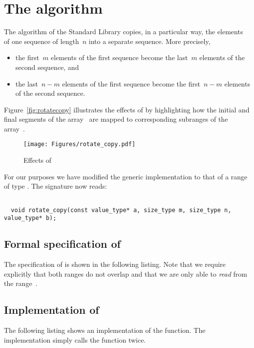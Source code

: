 
\section{The \rotatecopy algorithm}

The \rotatecopy algorithm of the \cxx Standard Library \cite[\S 28.6.11]{cxx-17-draft} copies, in a particular way,
the elements of one sequence of length~$n$ into a separate sequence.
More precisely,

\begin{itemize}
\item the first~$m$ elements of the first sequence become the last~$m$ elements of the second sequence, and
\item the last~$n-m$ elements of the first sequence become the first~$n-m$ elements of the second sequence.
\end{itemize}

Figure~\ref{fig:rotatecopy} illustrates the effects of \rotatecopy
by highlighting how the initial and final segments of the array~ are mapped
to corresponding subranges of the array~.

\begin{figure}[hbt]
\centering
\texttt{[image: Figures/rotate\_copy.pdf]}
\caption{ Effects of \rotatecopy}
\end{figure}

For our purposes we have modified the generic implementation
to that of a range of type .
%
The signature now reads:

\begin{lstlisting}[style=acsl-block]

  void rotate_copy(const value_type* a, size_type m, size_type n, value_type* b);
\end{lstlisting}



\subsection{Formal specification of \rotatecopy}

The specification of \rotatecopy is shown in the following listing.
Note that we require explicitly that both ranges do not overlap and that we are only
able to \emph{read} from the range~.



\subsection{Implementation of \rotatecopy}

The following listing shows an implementation of the \rotatecopy function.
The implementation simply calls the function \copyi twice.




